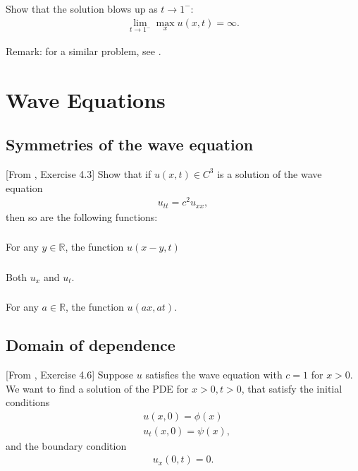 \documentclass[11pt,letterpaper]{report}
\begin{document}
\subsection{}
Show that the solution blows up as $t\to 1^-$:
\begin{align}
    \lim_{t\to 1^-} \max_x u(x,t) = \infty.
\end{align}

Remark: for a similar problem, see \cite[Exercise 2.2.11]{Olver_14}.

\chapter{Wave Equations}
\section{Symmetries of the wave equation}
[From \cite{ShearerLevy_15}, Exercise 4.3] Show that if $u(x,t)\in C^3$ is a solution of the wave equation
\begin{align}
    u_{tt} = c^2u_{xx},
\end{align}
then so are the following functions:

\subsection{}
For any $y\in\mathbb{R}$, the function $u(x-y,t)$

\subsection{}
Both $u_x$ and $u_t$.

\subsection{}
For any $a\in\mathbb{R}$, the function $u(ax,at)$. 

\section{Domain of dependence}
[From \cite{ShearerLevy_15}, Exercise 4.6] Suppose $u$ satisfies the wave equation with $c=1$ for $x>0$. We want to find a solution of the PDE for $x>0, t>0$, that satisfy the initial conditions
\begin{align}
    & u(x,0) = \phi(x)\\
    & u_t(x,0) = \psi(x),
\end{align}
and the boundary condition
\begin{align}
    u_x(0,t) = 0.
\end{align}
\end{document}
